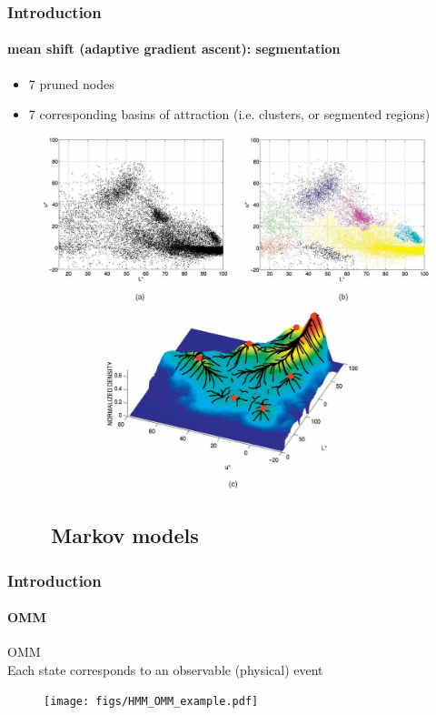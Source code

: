 \begin{frame}
\frametitle{Introduction}
\framesubtitle{mean shift {\small (adaptive gradient ascent)}: segmentation}
\logoCSIPCPL\mypagenum
{}
	\begin{itemize}				
		\item 7 pruned nodes
		\item 7 corresponding basins of attraction (i.e. clusters, or segmented regions)
	\end{itemize}
	\begin{figure}
		\includegraphics[height=0.6\textheight]{figs/PRML_meanShift2.pdf}
	\end{figure}
\end{frame}



\subsection{\ \ \ \ Markov models}
\begin{frame}
\frametitle{Introduction}
\framesubtitle{OMM}
\logoCSIPCPL\mypagenum
	{\color{red} OMM}\\
	Each state corresponds to an observable (physical) event
	\begin{figure}				
		\texttt{[image: figs/HMM\_OMM\_example.pdf]}
	\end{figure}
\end{frame}




